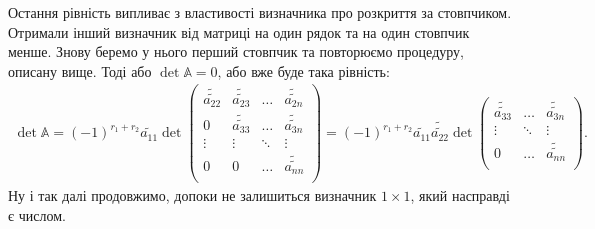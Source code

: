 \documentclass{math_library}
\begin{document}
Остання рівність випливає з властивості визначника про розкриття за стовпчиком.\\
Отримали інший визначник від матриці на один рядок та на один стовпчик менше. Знову беремо у нього перший стовпчик та повторюємо процедуру, описану вище. Тоді або $\det \mathbb{A} = 0$, або вже буде така рівність:
\begin{align*}
\det \mathbb{A} = (-1)^{r_1+r_2} \widetilde{a_{11}} \det \begin{pmatrix}
\widetilde{\widetilde{a_{22}}} & \widetilde{\widetilde{a_{23}}} & \dots & \widetilde{\widetilde{a_{2n}}} \\
0 & \widetilde{\widetilde{a_{33}}} & \dots & \widetilde{\widetilde{a_{3n}}} \\
\vdots & \vdots & \ddots & \vdots \\
0 & 0 & \dots & \widetilde{\widetilde{a_{nn}}} \\
\end{pmatrix} = (-1)^{r_1+r_2} \widetilde{a_{11}} \widetilde{\widetilde{a_{22}}} \det \begin{pmatrix}
\widetilde{\widetilde{a_{33}}} & \dots & \widetilde{\widetilde{a_{3n}}} \\
\vdots & \ddots & \vdots \\
0 & \dots & \widetilde{\widetilde{a_{nn}}} \\
\end{pmatrix}.
\end{align*}
Ну і так далі продовжимо, допоки не залишиться визначник $1 \times 1$, який насправді є числом.
\end{document}
